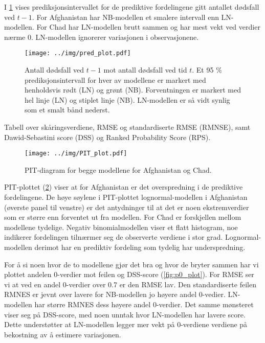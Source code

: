 I \cref{fig:pred_plot} vises prediksjonsintervallet for de prediktive
fordelingene gitt antallet dødsfall ved $t-1$. For Afghanistan har NB-modellen
et smalere intervall enn LN-modellen. For Chad har LN-modellen brutt sammen og
har mest vekt ved verdier nærme 0. LN-modellen ignorerer variasjonen i
observasjonene.  

\begin{figure}[!h]
\centering
\texttt{[image: ../img/pred\_plot.pdf]}
\caption{
    Antall dødsfall ved $t-1$ mot antall dødsfall ved tid $t$. Et 95 \%
    prediksjonsintervall for hver av modellene er markert med henholdsvis rødt
    (LN) og grønt (NB). Forventningen er markert med hel linje (LN) og stiplet
    linje (NB). LN-modellen er så vidt synlig som et smalt bånd nederst.
} 
\label{fig:pred_plot}
\end{figure}

\begin{table}[!h]
\centering

    \caption{Tabell over skåringsverdiene, RMSE og standardiserte RMSE
    (RMNSE), samt Dawid-Sebastini score (DSS) og Ranked Probability Score
    (RPS).}
\label{tab:scoring_summary}
\end{table}

\begin{figure}[!h]
\centering
\texttt{[image: ../img/PIT\_plot.pdf]}
\caption{
    PIT-diagram for begge modellene for Afghanistan og
    Chad. 
}
\label{fig:PIT_plot}
\end{figure}

PIT-plottet (\cref{fig:PIT_plot}) viser at for Afghanistan er det overspredning
i de prediktive fordelingene. De høye søylene i PIT-plottet lognormal-modellen
i Afghanistan (øverste panel til venstre) er det antydninger til at det er noen
ekstremverdier som er større enn forventet ut fra modellen. For Chad er
forskjellen mellom modellene tydelige. Negativ binomialmodellen viser et flatt
histogram, noe indikerer fordelingen tilnærmer seg de observerte verdiene i
stor grad. Lognormal-modellen derimot har en prediktiv fordeling som tydelig har underspredning.  

For å si noen hvor de to modellene gjør det bra og hvor de bryter sammen har vi
plottet andelen 0-verdier mot feilen og DSS-score (\cref{fig:p0_plot}). For
RMSE ser vi at ved en andel 0-verdier over 0.7 er den RMSE lav. Den
standardiserte feilen RMNES er jevnt over lavere for NB-modellen jo høyere
andel 0-vedier. LN-modellen har større RMNES dess høyere andel 0-verdier. Det
samme mønsteret viser seg på DSS-score, med noen unntak hvor LN-modellen har
lavere score. Dette understøtter at LN-modellen legger mer vekt på 0-verdiene
verdiene på bekostning av å estimere variasjonen.


